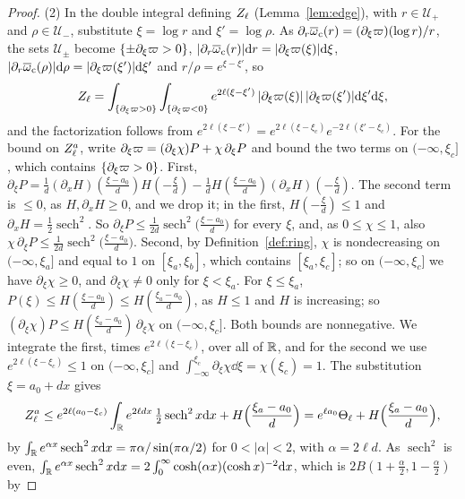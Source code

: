 \begin{proof}
(2) In the double integral defining $Z_\ell$ (Lemma~\ref{lem:edge}), with
$r\in\mathcal U_+$ and $\rho\in\mathcal U_-$, substitute $\xi=\log r$ and
$\xi'=\log\rho$. As $\partial_r\overline{\omega}_{\mathrm{c}}(r)=(\partial_\xi\varpi)(\log r)/r$, the sets
$\mathcal U_\pm$ become $\{\pm\partial_\xi\varpi>0\}$,
$|\partial_r\overline{\omega}_{\mathrm{c}}(r)|\dd r=|\partial_\xi\varpi(\xi)|\dd\xi$,
$|\partial_r\overline{\omega}_{\mathrm{c}}(\rho)|\dd\rho=|\partial_\xi\varpi(\xi')|\dd\xi'$ and
$r/\rho=e^{\xi-\xi'}$, so
\[
Z_\ell=\int_{\{\partial_\xi\varpi>0\}}\int_{\{\partial_\xi\varpi<0\}}
e^{2\ell(\xi-\xi')}\,|\partial_\xi\varpi(\xi)|\,|\partial_\xi\varpi(\xi')|\dd\xi'\dd\xi ,
\]
and the factorization follows from
$e^{2\ell(\xi-\xi')}=e^{2\ell(\xi-\xi_c)}e^{-2\ell(\xi'-\xi_c)}$. For the bound on
$Z^a_\ell$, write $\partial_\xi\varpi=(\partial_\xi\chi)P+\chi\,\partial_\xi P$ and
bound the two terms on $(-\infty,\xi_c]$, which contains $\{\partial_\xi\varpi>0\}$.
First,
$\partial_\xi P=\frac1d(\partial_xH)(\frac{\xi-a_0}d)H(-\frac\xi d)-\frac1dH(\frac{\xi-a_0}d)(\partial_xH)(-\frac\xi d)$.
The second term is $\le0$, as $H,\partial_xH\ge0$, and we drop it; in the first,
$H(-\frac\xi d)\le1$ and $\partial_xH=\frac12\operatorname{sech}^2$. So
$\partial_\xi P\le\frac1{2d}\operatorname{sech}^2\big(\frac{\xi-a_0}d\big)$ for every $\xi$,
and, as $0\le\chi\le1$, also
$\chi\,\partial_\xi P\le\frac1{2d}\operatorname{sech}^2\big(\frac{\xi-a_0}d\big)$.
Second, by Definition~\ref{def:ring}, $\chi$ is nondecreasing on $(-\infty,\xi_a]$ and
equal to $1$ on $[\xi_a,\xi_b]$, which contains $[\xi_a,\xi_c]$; so on
$(-\infty,\xi_c]$ we have $\partial_\xi\chi\ge0$, and $\partial_\xi\chi\ne0$ only for
$\xi<\xi_a$. For $\xi\le\xi_a$, $P(\xi)\le H(\frac{\xi-a_0}d)\le H(\frac{\xi_a-a_0}d)$, as
$H\le1$ and $H$ is increasing; so
$(\partial_\xi\chi)P\le H(\frac{\xi_a-a_0}d)\,\partial_\xi\chi$ on $(-\infty,\xi_c]$.
Both bounds are nonnegative. We integrate the first, times $e^{2\ell(\xi-\xi_c)}$,
over all of $\mathbb{R}$, and for the second we use $e^{2\ell(\xi-\xi_c)}\le1$ on
$(-\infty,\xi_c]$ and $\int_{-\infty}^{\xi_c}\partial_\xi\chi\dd\xi=\chi(\xi_c)=1$. The
substitution $\xi=a_0+dx$ gives
\[
Z^a_\ell\le e^{2\ell(a_0-\xi_c)}\int_{\mathbb{R}} e^{2\ell dx}\,\tfrac12\operatorname{sech}^2x\dd x
+H\Big(\frac{\xi_a-a_0}d\Big)=e^{\ell a_0}\Theta_{\ell}+H\Big(\frac{\xi_a-a_0}d\Big),
\]
by $\int_{\mathbb{R}} e^{\alpha x}\operatorname{sech}^2x\dd x=\pi\alpha/\sin(\pi\alpha/2)$ for
$0<|\alpha|<2$, with $\alpha=2\ell d$. As
$\operatorname{sech}^2$ is even,
$\int_{\mathbb{R}} e^{\alpha x}\operatorname{sech}^2x\dd x=2\int_0^\infty\cosh(\alpha x)(\cosh x)^{-2}\dd x$,
which is $2B(1+\frac\alpha2,1-\frac\alpha2)$ by

\end{proof}
